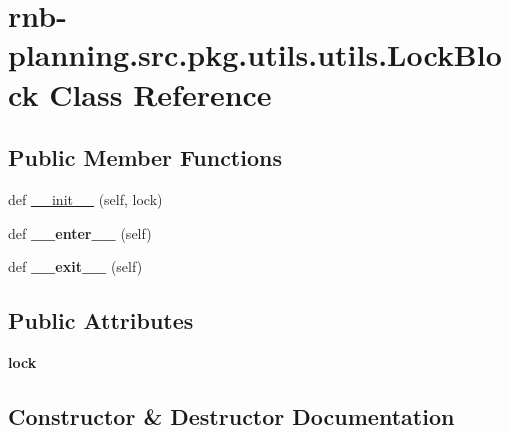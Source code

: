 \hypertarget{classrnb-planning_1_1src_1_1pkg_1_1utils_1_1utils_1_1_lock_block}{}\section{rnb-\/planning.src.\+pkg.\+utils.\+utils.\+Lock\+Block Class Reference}
\label{classrnb-planning_1_1src_1_1pkg_1_1utils_1_1utils_1_1_lock_block}
\subsection*{Public Member Functions}
\begin{DoxyCompactItemize}
\item 
def \hyperlink{classrnb-planning_1_1src_1_1pkg_1_1utils_1_1utils_1_1_lock_block_ae1a6adec697e5600ef3e06235c149608}{\+\_\+\+\_\+init\+\_\+\+\_\+} (self, lock)
\item 
\mbox{\label{classrnb-planning_1_1src_1_1pkg_1_1utils_1_1utils_1_1_lock_block_a7081985df611c68588381d3f53821959}} 
def {\bfseries \+\_\+\+\_\+enter\+\_\+\+\_\+} (self)
\item 
\mbox{\label{classrnb-planning_1_1src_1_1pkg_1_1utils_1_1utils_1_1_lock_block_a2866feff16adcb0872ef4a2f1facd97b}} 
def {\bfseries \+\_\+\+\_\+exit\+\_\+\+\_\+} (self)
\end{DoxyCompactItemize}
\subsection*{Public Attributes}
\begin{DoxyCompactItemize}
\item 
\mbox{\label{classrnb-planning_1_1src_1_1pkg_1_1utils_1_1utils_1_1_lock_block_a9ae2e6b01ab548b0e2d2ed7039efa479}} 
{\bfseries lock}
\end{DoxyCompactItemize}


\subsection{Constructor \& Destructor Documentation}
\mbox{\label{classrnb-planning_1_1src_1_1pkg_1_1utils_1_1utils_1_1_lock_block_ae1a6adec697e5600ef3e06235c149608}} 
